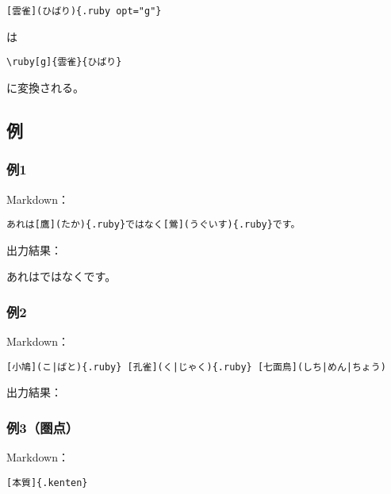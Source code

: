 \documentclass[
  a4paper,
  lualatex,
  ja=standard]{bxjsarticle}
\begin{document}
\begin{verbatim}
[雲雀](ひばり){.ruby opt="g"}
\end{verbatim}

は

\begin{verbatim}
\ruby[g]{雲雀}{ひばり}
\end{verbatim}

に変換される。

\hypertarget{ux4f8b}{%
\subsection{例}\label{ux4f8b}}

\hypertarget{ux4f8b1}{%
\subsubsection{例1}\label{ux4f8b1}}

Markdown：

\begin{verbatim}
あれは[鷹](たか){.ruby}ではなく[鶯](うぐいす){.ruby}です。
\end{verbatim}

出力結果：

あれは{}ではなく{}です。

\hypertarget{ux4f8b2}{%
\subsubsection{例2}\label{ux4f8b2}}

Markdown：

\begin{verbatim}
[小鳩](こ|ばと){.ruby} [孔雀](く|じゃく){.ruby} [七面鳥](しち|めん|ちょう)
\end{verbatim}

出力結果：

{} {}
{}

\hypertarget{ux4f8b3ux570fux70b9}{%
\subsubsection{例3（圏点）}\label{ux4f8b3ux570fux70b9}}

Markdown：

\begin{verbatim}
[本質]{.kenten}
\end{verbatim}
\end{document}

